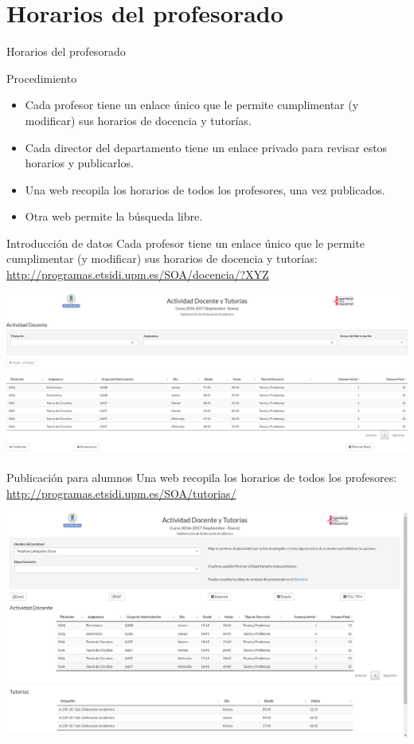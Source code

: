 \documentclass[spanish, xcolor={usenames,svgnames,dvipsnames}]{beamer}
\begin{document}
\section{Horarios del profesorado}
\label{sec:orge30a60a}
\begin{frame}[label={sec:org4598884}]{Horarios del profesorado}
\begin{block}{Procedimiento}
\begin{itemize}
\item Cada profesor tiene un enlace único que le permite cumplimentar (y modificar) sus horarios de docencia y tutorías.
\item Cada director del departamento tiene un enlace privado para revisar estos horarios y publicarlos.
\item Una web recopila los horarios de todos los profesores, una vez publicados.
\item Otra web permite la búsqueda libre.
\end{itemize}
\end{block}
\end{frame}

\begin{frame}[label={sec:orgdcd9d7c}]{Introducción de datos}
Cada profesor tiene un enlace único que le permite cumplimentar (y modificar) sus horarios de docencia y tutorías: \url{http://programas.etsidi.upm.es/SOA/docencia/?XYZ}

\begin{center}
\includegraphics[width=.9\linewidth]{images/formulario-docencia.png}
\end{center}
\end{frame}

\begin{frame}[label={sec:org5c85101}]{Publicación para alumnos}
Una web recopila los horarios de todos los profesores: \url{http://programas.etsidi.upm.es/SOA/tutorias/}

\begin{center}
\includegraphics[width=.9\linewidth]{images/tutorias.png}
\end{center}
\end{frame}
\end{document}
